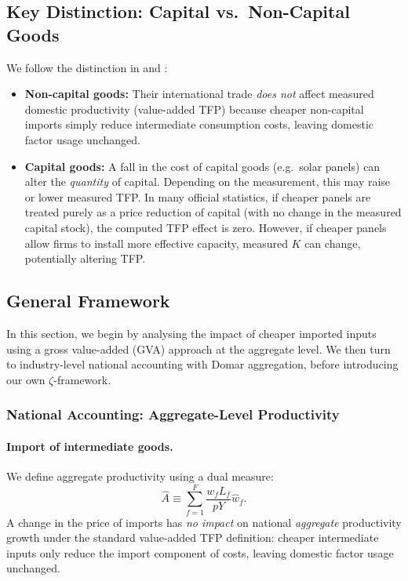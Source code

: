 \documentclass[11pt]{article}
\begin{document}
\subsection{Key Distinction: Capital vs.\ Non-Capital Goods}
We follow the distinction in \cite{eatonTradeCapitalGoods2001} and \cite{xuCapitalGoodsTrade1999}:
\begin{itemize}
\item \textbf{Non-capital goods:} Their international trade \emph{does not} affect measured domestic 
productivity (value-added TFP) because cheaper non-capital imports simply reduce intermediate 
consumption costs, leaving domestic factor usage unchanged.
\item \textbf{Capital goods:} A fall in the cost of capital goods (e.g.\ solar panels) can alter the 
\emph{quantity} of capital. Depending on the measurement, this may raise or lower measured TFP. 
In many official statistics, if cheaper panels are treated purely as a price reduction of capital 
(with no change in the measured capital stock), the computed TFP effect is zero. However, if 
cheaper panels allow firms to install more effective capacity, measured $K$ can change, potentially 
altering TFP.
\end{itemize}

\subsection{General Framework}
In this section, we begin by analysing the impact of cheaper imported inputs using a gross 
value-added (GVA) approach at the aggregate level. We then turn to industry-level national 
accounting with Domar aggregation, before introducing our own $\zeta$-framework.

\subsubsection{National Accounting: Aggregate-Level Productivity}

\paragraph{Import of intermediate goods.}
We define aggregate productivity using a dual measure:
\begin{equation}
\label{eq:agg_A_hat}
    \hat{A}   \equiv   \sum_{f=1}^F \frac{w_f   L_{f}}{p   Y}   \hat{w}_f.
\end{equation}
A change in the price of imports has \emph{no impact} on national \emph{aggregate} productivity 
growth under the standard value-added TFP definition: cheaper intermediate inputs only reduce 
the import component of costs, leaving domestic factor usage unchanged. 
\end{document}
